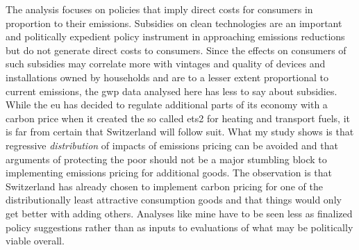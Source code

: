 \documentclass[referee, lineno, pdflatex,sn-apa]{sn-jnl}%
\theoremstyle{thmstyleone}%
\theoremstyle{thmstyletwo}%
\theoremstyle{thmstylethree}%
\begin{document}
The analysis focuses on policies that imply direct costs for consumers in proportion to their emissions.
Subsidies on clean technologies are an important and politically expedient policy instrument in approaching emissions reductions but do not generate direct costs to consumers.
Since the effects on consumers of such subsidies may correlate more with vintages and quality of devices and installations owned by households and are to a lesser extent proportional to current emissions, the \ac{gwp}  data analysed here has less to say about subsidies.
While the \ac{eu} has decided to regulate additional parts of its economy with a carbon price when it created the so called \ac{ets}2 for heating and transport fuels, it is far from certain that Switzerland will follow suit.
What my study shows is that regressive \emph{distribution} of impacts of emissions pricing can be avoided and that arguments of protecting the poor should not be a major stumbling block to implementing emissions pricing for additional goods.
The observation is that Switzerland has already chosen to implement carbon pricing for one of the distributionally least attractive consumption goods and that things would only get better with adding others.
Analyses like mine have to be seen less as finalized policy suggestions rather than as inputs to evaluations of what may be politically viable overall.
\end{document}
